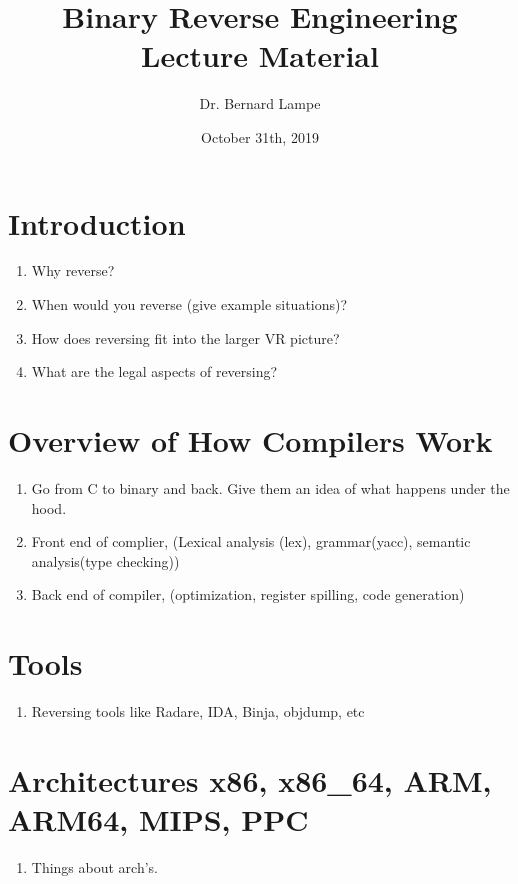 \documentclass[12pt]{Training}
\title{Binary Reverse Engineering Lecture Material}
\author{Dr. Bernard Lampe}
\date{October 31th, 2019}
\begin{document}
\maketitle


\section*{Introduction}
\begin{enumerate}
    \item Why reverse?
    \item When would you reverse (give example situations)?
    \item How does reversing fit into the larger VR picture?
    \item What are the legal aspects of reversing?
\end{enumerate}

\section*{Overview of How Compilers Work}
\begin{enumerate}
    \item Go from C to binary and back. Give them an idea of what happens under the hood.
    \item Front end of complier, (Lexical analysis (lex), grammar(yacc), semantic analysis(type checking)) 
    \item Back end of compiler, (optimization, register spilling, code generation)
\end{enumerate}

\section*{Tools}
\begin{enumerate}
    \item Reversing tools like Radare, IDA, Binja, objdump, etc
\end{enumerate}

\section*{Architectures x86, x86\_64, ARM, ARM64, MIPS, PPC}
\begin{enumerate}
    \item Things about arch's.
\end{enumerate}
\end{document}
